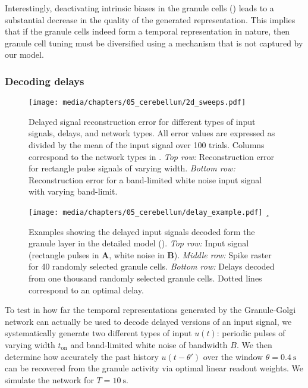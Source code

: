 Interestingly, deactivating intrinsic biases in the granule cells () leads to a substantial decrease in the quality of the generated representation.
This implies that if the granule cells indeed form a temporal representation in nature, then granule cell tuning must be diversified using a mechanism that is not captured by our model.

\subsubsection{Decoding delays}

\begin{figure}
	\centering
	\texttt{[image: media/chapters/05\_cerebellum/2d\_sweeps.pdf]}
	\caption[Delayed signal reconstruction errors in the Cerebellum model.]{Delayed signal reconstruction error for different types of input signals, delays, and network types. All error values are expressed as \RMSE divided by the mean \RMS of the input signal over 100 trials. Columns correspond to the network types in . \emph{Top row:} Reconstruction error for rectangle pulse signals of varying width. \emph{Bottom row:} Reconstruction error for a band-limited white noise input signal with varying band-limit.}
	\label{fig:cerebellum_2d_sweeps}
\end{figure}

\begin{figure}
	\centering
    \texttt{[image: media/chapters/05\_cerebellum/delay\_example.pdf]}%
    {\label{fig:delay_example_a}}%
    {¸\label{fig:delay_example_b}}%
	\caption[Examples showing the delayed input signals decoded form the granule layer in the detailed model.]{Examples showing the delayed input signals decoded form the granule layer in the detailed model (). \emph{Top row:} Input signal (rectangle pulses in \textbf{A}, white noise in \textbf{B}). \emph{Middle row:} Spike raster for 40 randomly selected granule cells. \emph{Bottom row:} Delays decoded from one thousand randomly selected granule cells. Dotted lines correspond to an optimal delay.}
	\label{fig:cerebellum_delay_example}
\end{figure}

To test in how far the temporal representations generated by the Granule-Golgi network can actually be used to decode delayed versions of an input signal, we systematically generate two different types of input $u(t)$: periodic pulses of varying width $t_\mathrm{on}$ and band-limited white noise of bandwidth $B$.
We then determine how accurately the past history $u(t - \theta')$ over the window $\theta = \SI{0.4}{\second}$ can be recovered from the granule activity via optimal linear readout weights.
We simulate the network for $T = \SI{10}{\second}$.

